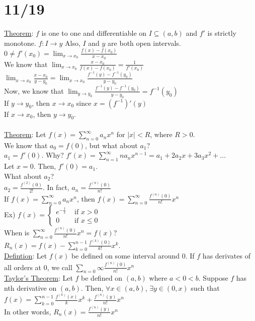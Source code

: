 \documentclass[11pt]{article}
\begin{document}
\section*{11/19}
	\underline{Theorem}: $f$ is one to one and differentiable on $I \subseteq
	(a,b)$ and $f'$ is strictly monotone. $f:I \to y$ Also, $I$ and $y$ are
	both open intervals.\\
	$0 \not= f'(x_0) = \lim_{x \to x_0}\frac{f(x) - f(x_0)}{x - x_0}$\\
	We know that $\lim_{x \to x_0}\frac{x - x_0}{f(x) - f(x_0)} = \frac{1}
	{f'(x_0)}$\\
	$\lim_{x \to x_0}\frac{x - x_0}{y - y_0} = \lim_{x \to x_0}\frac{f^{-1}
	(y) - f^{-1}(y_0)}{y - y_0}$\\
	Now, we know that $\lim_{y \to y_0}\frac{f^{-1}(y) - f^{-1}(y_0)}{y - y_0}
	= f^{-1}(y_0)$\\
	If $y \to y_0$, then $x \to x_0$ since $x = (f^{-1})'(y)$\\
	If $x \to x_0$, then $y \to y_0$.\\\\
	\underline{Theorem}: Let $f(x) = \sum_{n = 0}^{\infty}a_nx^n$ for $|x| <
	R$, where $R > 0$.\\
	We know that $a_0 = f(0)$, but what about $a_1$?\\
	$a_1 = f'(0)$. Why?
	$f'(x) = \sum_{n = 1}^{\infty} na_nx^{n-1} = a_1 + 2a_2x + 3a_3x^2 + \ldots
	$\\
	Let $x = 0$. Then, $f'(0) = a_1.$\\
	What about $a_2$?\\
	$a_2 = \frac{f^{(2)}(0)}{2!}$. In fact, $a_n = \frac{f^{(n)}(0)}{n!}$\\
	If $f(x) = \sum_{n = 0}^{\infty} a_n x^n$, then $f(x) = 
	\sum_{n = 0}^{\infty} \frac{f^{(n)}(0)}{n!} x^n$\\
	Ex) $f(x) = \begin{cases} e^{-\frac{1}{x}} & \text{ if } x > 0\\
	0 & \text{ if } x \le 0 \end{cases}$\\
	When is $\sum_{n = 0}^{\infty} \frac{f^{(n)}(0)}{n!} x^n = f(x)$?\\
	$R_n(x) = f(x) - \sum_{k = 0}^{n - 1} \frac{f^{(k)}(0)}{k!} x^k$.\\
	\underline{Defintion}: Let $f(x)$ be defined on some interval around 0. If
	$f$ has derivates of all orders at 0, we call $\sum_{n = 0}{\infty}\frac
	{f^{(n)}(0)}{n!} x^n$\\
	\underline{Taylor's Theorem}: Let $f$ be defined on $(a,b)$ where
	$a < 0 < b$. Suppose $f$ has nth derivative on $(a,b)$. Then, $\forall
	x \in (a,b)$, $\exists y \in (0, x)$ such that $f(x) = \sum_{k = 0}^{n - 1}
	\frac{f^{(k)}(x)}{k} x^k + \frac{f^{(n)}(y)}{n!} x^n$\\
	In other words, $R_n(x) = \frac{f^{(n)}(y)}{n!}x^n$\\
\end{document}
